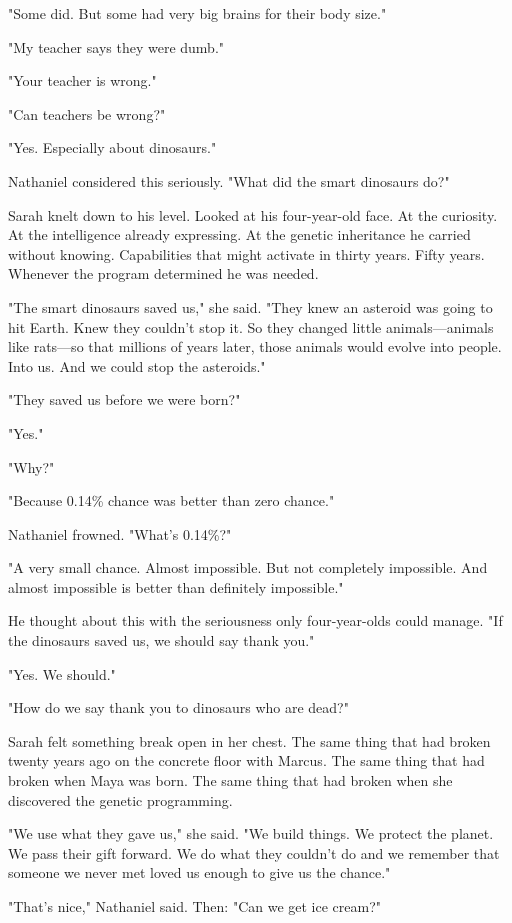 "Some did. But some had very big brains for their body size."

"My teacher says they were dumb."

"Your teacher is wrong."

"Can teachers be wrong?"

"Yes. Especially about dinosaurs."

Nathaniel considered this seriously. "What did the smart dinosaurs do?"

Sarah knelt down to his level. Looked at his four-year-old face. At the curiosity. At the intelligence already expressing. At the genetic inheritance he carried without knowing. Capabilities that might activate in thirty years. Fifty years. Whenever the program determined he was needed.

"The smart dinosaurs saved us," she said. "They knew an asteroid was going to hit Earth. Knew they couldn't stop it. So they changed little animals—animals like rats—so that millions of years later, those animals would evolve into people. Into us. And we could stop the asteroids."

"They saved us before we were born?"

"Yes."

"Why?"

"Because 0.14\% chance was better than zero chance."

Nathaniel frowned. "What's 0.14\%?"

"A very small chance. Almost impossible. But not completely impossible. And almost impossible is better than definitely impossible."

He thought about this with the seriousness only four-year-olds could manage. "If the dinosaurs saved us, we should say thank you."

"Yes. We should."

"How do we say thank you to dinosaurs who are dead?"

Sarah felt something break open in her chest. The same thing that had broken twenty years ago on the concrete floor with Marcus. The same thing that had broken when Maya was born. The same thing that had broken when she discovered the genetic programming.

"We use what they gave us," she said. "We build things. We protect the planet. We pass their gift forward. We do what they couldn't do and we remember that someone we never met loved us enough to give us the chance."

"That's nice," Nathaniel said. Then: "Can we get ice cream?"

